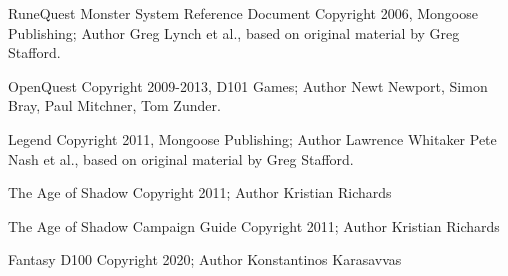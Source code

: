 \begin{scriptsize}
\noindent RuneQuest Monster System Reference Document Copyright 2006, Mongoose Publishing; Author Greg Lynch et al., based on original material by Greg Stafford.

\noindent OpenQuest Copyright 2009-2013, D101 Games; Author Newt Newport, Simon Bray, Paul Mitchner, Tom Zunder.

\noindent Legend Copyright 2011, Mongoose Publishing; Author Lawrence Whitaker Pete Nash et al., based on original material by Greg Stafford.

\noindent The Age of Shadow Copyright 2011; Author Kristian Richards

\noindent The Age of Shadow Campaign Guide Copyright 2011; Author Kristian Richards


\noindent Fantasy D100 Copyright 2020; Author Konstantinos Karasavvas
\end{scriptsize}
